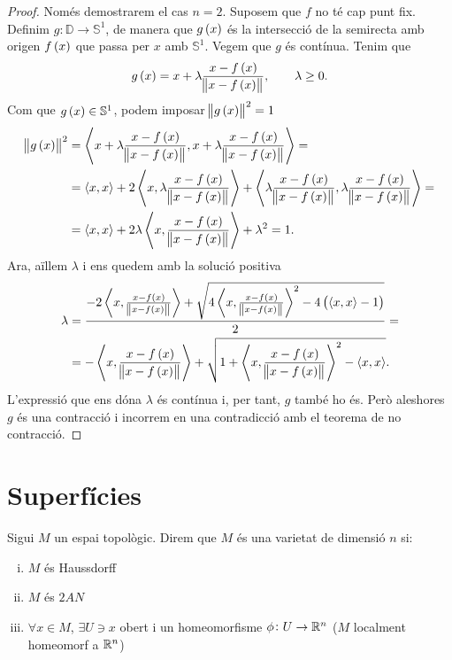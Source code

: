 \begin{proof}
    Només demostrarem el cas $n=2$. Suposem que $f$ no té cap punt fix. Definim $g\colon \mathbb{D} \to \mathbb{S}^1$, de manera que $g\left( x \right)$ és la intersecció de la semirecta amb origen $f\left( x \right)$ que passa per $x$ amb $\mathbb{S}^1$. Vegem que $g$ és contínua. Tenim que
    \[
        g\left( x \right) = x+\lambda\frac{x-f\left( x \right)}{\norm{x-f\left( x \right)}}, \qquad \lambda \geq 0.
    \]
    Com que $g\left( x\right) \in \mathbb{S}^1$, podem imposar $\norm{g\left( x \right)}^2 = 1$
    \begin{align*}
        \norm{g\left( x \right)}^2 &= \left< x+\lambda\frac{x-f\left( x \right)}{\norm{x-f\left( x \right)}}, x+\lambda\frac{x-f\left( x \right)}{\norm{x-f\left( x \right)}} \right> = \\
        &=  \left< x, x \right> + 2\left< x, \lambda\frac{x-f\left( x \right)}{\norm{x-f\left( x \right)}} \right> + \left<\lambda\frac{x-f\left( x \right)}{\norm{x-f\left( x \right)}}, \lambda\frac{x-f\left( x \right)}{\norm{x-f\left( x \right)}} \right> = \\
        &=  \left< x, x \right> + 2\lambda \left< x, \frac{x-f\left( x \right)}{\norm{x-f\left( x \right)}} \right> + \lambda ^2 = 1.
    \end{align*}
    Ara, aïllem $\lambda$ i ens quedem amb la solució positiva
    \begin{align*}
        \lambda &= \frac{-2\left< x, \frac{x-f\left( x \right)}{\norm{x-f\left( x \right)}} \right> + \sqrt{4\left< x, \frac{x-f\left( x \right)}{\norm{x-f\left( x \right)}} \right> ^2 -4\left( \left<x, x\right> -1 \right)}}{2} = \\
        &= -\left< x, \frac{x-f\left( x \right)}{\norm{x-f\left( x \right)}} \right> + \sqrt{1+\left< x, \frac{x-f\left( x \right)}{\norm{x-f\left( x \right)}} \right> ^2 -\left<x, x\right>}.
    \end{align*}
    L'expressió que ens dóna $\lambda$ és contínua i, per tant, $g$ també ho és. Però aleshores $g$ és una contracció i incorrem en una contradicció amb el teorema de no contracció.
\end{proof}

\section{Superfícies}

\begin{defi}[Varietat]
    Sigui $M$ un espai topològic. Direm que $M$ és una varietat de dimensió $n$ si:
    \begin{enumerate}[i)]
	\item $M$ és Haussdorff
	\item $M$ és $2AN$
	\item $\forall x \in M$, $\exists U \ni x$ obert i un homeomorfisme
	    $\phi \colon U \to \mathbb{R}^n$ ($M$ localment homeomorf a $\mathbb{R}^n$)
    \end{enumerate}
\end{defi}

